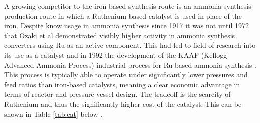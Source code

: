 A growing competitor to the iron-based synthesis route is an ammonia synthesis production route in which a Ruthenium based catalyst is used in place of the iron. Despite know usage in ammonia synthesis since 1917 it was not until 1972 that Ozaki et al demonstrated visibly higher activity in ammonia synthesis converters using Ru as an active component. This had led to field of research into its use as a catalyst and in 1992 the development of the KAAP (Kellogg Advanced Ammonia Process) industrial process for Ru-based ammonia synthesis \cite{Rossetti2006}. This process is typically able to operate under significantly lower pressures and feed ratios than iron-based catalysts, meaning a clear economic advantage in terms of reactor and pressure vessel design. The tradeoff is the scarcity of Ruthenium and thus the significantly higher cost of the catalyst. This can be shown in Table \ref{tab:cat} below \cite{Liu2014}.
